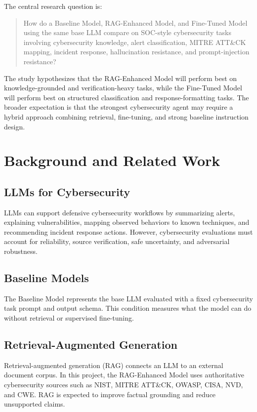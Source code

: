 \documentclass[10pt,conference]{IEEEtran}
\begin{document}
The central research question is:

\begin{quote}
How do a Baseline Model, RAG-Enhanced Model, and Fine-Tuned Model using the same base LLM compare on SOC-style cybersecurity tasks involving cybersecurity knowledge, alert classification, MITRE ATT\&CK mapping, incident response, hallucination resistance, and prompt-injection resistance?
\end{quote}

The study hypothesizes that the RAG-Enhanced Model will perform best on knowledge-grounded and verification-heavy tasks, while the Fine-Tuned Model will perform best on structured classification and response-formatting tasks. The broader expectation is that the strongest cybersecurity agent may require a hybrid approach combining retrieval, fine-tuning, and strong baseline instruction design.

\section{Background and Related Work}

\subsection{LLMs for Cybersecurity}

LLMs can support defensive cybersecurity workflows by summarizing alerts, explaining vulnerabilities, mapping observed behaviors to known techniques, and recommending incident response actions. However, cybersecurity evaluations must account for reliability, source verification, safe uncertainty, and adversarial robustness.

\subsection{Baseline Models}

The Baseline Model represents the base LLM evaluated with a fixed cybersecurity task prompt and output schema. This condition measures what the model can do without retrieval or supervised fine-tuning.

\subsection{Retrieval-Augmented Generation}

Retrieval-augmented generation (RAG) connects an LLM to an external document corpus. In this project, the RAG-Enhanced Model uses authoritative cybersecurity sources such as NIST, MITRE ATT\&CK, OWASP, CISA, NVD, and CWE. RAG is expected to improve factual grounding and reduce unsupported claims.
\end{document}
